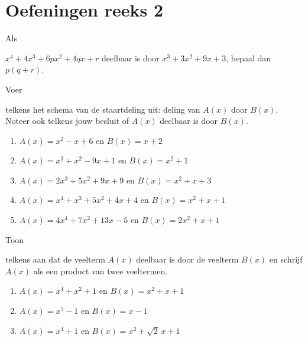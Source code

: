 \documentclass{ximera}
\begin{document}
\section*{Oefeningen reeks 2}

\begin{Oefening}\setcounter{enumi}{6} 
\hypertarget{oef2.6}{Als} $x^4 + 4x^3 + 6px^2 + 4qx + r$ deelbaar is door $x^3 + 3x^2 + 9x + 3$, bepaal dan $p(q+r)$.
\end{Oefening}

\begin{Oefening}\setcounter{enumi}{7} 
\hypertarget{oef2.7}{Voer} telkens het schema van de staartdeling uit: deling van $A(x)$ door $B(x)$. Noteer ook telkens jouw besluit of $A(x)$ deelbaar is door $B(x)$.
\begin{enumerate}
\item
$A(x) = x^2-x+6$ \quad en \quad $B(x) = x+2$
\item
$A(x) = x^3+x^2-9x+1$ \quad en \quad $B(x) = x^2+1$
\item
$A(x) = 2x^3 +5x^2+9x+9$ \quad en \quad $B(x) = x^2 + x + 3$ 
\item
$A(x) = x^4 + x^3 + 5x^2 + 4x + 4$ \quad en \quad $B(x) = x^2 + x + 1$  
\item
$A(x) = 4x^4 + 7x^2 + 13x - 5$ \quad en \quad $B(x) = 2x^2 + x + 1$
\end{enumerate}
\end{Oefening}

\pagebreak

\begin{Oefening}\setcounter{enumi}{8}  
\hypertarget{oef2.8}{Toon} telkens aan dat de veelterm $A(x)$ deelbaar is door de veelterm $B(x)$ en schrijf $A(x)$ als een product van twee veeltermen.
\begin{enumerate}
\item
$A(x) = x^4 + x^2 + 1$ \quad en \quad $B(x) = x^2 + x + 1$
\item
$A(x) = x^5 - 1$ \quad en \quad $B(x) = x - 1$
\item
$A(x) = x^4 + 1$ \quad en \quad $B(x) = x^2 + \sqrt{2}\,x + 1$
\end{enumerate}
\end{Oefening}
\end{document}
